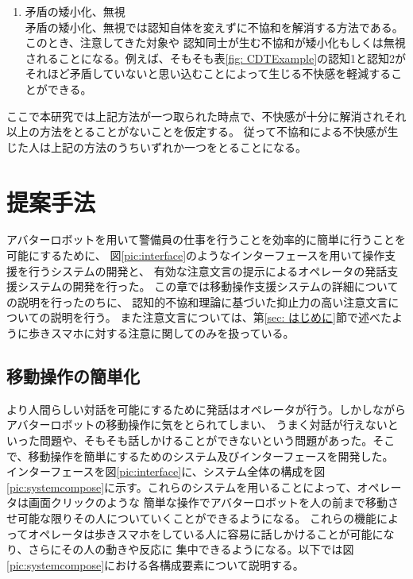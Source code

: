 \documentclass{kuisthesis}
\begin{document}
\begin{enumerate}
\begin{table}[H]
\end{table}

  \item 矛盾の矮小化、無視 \\
  矛盾の矮小化、無視では認知自体を変えずに不協和を解消する方法である。このとき、注意してきた対象や
  認知同士が生む不協和が矮小化もしくは無視されることになる。例えば、そもそも表\ref{fig: CDTExample}の認知1と認知2が
それほど矛盾していないと思い込むことによって生じる不快感を軽減することができる。

\end{enumerate}
\vspace{3mm}
ここで本研究では上記方法が一つ取られた時点で、不快感が十分に解消されそれ以上の方法をとることがないことを仮定する。
従って不協和による不快感が生じた人は上記の方法のうちいずれか一つをとることになる。

\vspace{3mm}

\section{提案手法}
アバターロボットを用いて警備員の仕事を行うことを効率的に簡単に行うことを可能にするために、
図\ref{pic:interface}のようなインターフェースを用いて操作支援を行うシステムの開発と、
有効な注意文言の提示によるオペレータの発話支援システムの開発を行った。
この章では移動操作支援システムの詳細についての説明を行ったのちに、
認知的不協和理論に基づいた抑止力の高い注意文言についての説明を行う。
また注意文言については、第\ref{sec: はじめに}節で述べたように歩きスマホに対する注意に関してのみを扱っている。

\subsection{移動操作の簡単化}
より人間らしい対話を可能にするために発話はオペレータが行う。しかしながらアバターロボットの移動操作に気をとられてしまい、
うまく対話が行えないといった問題や、そもそも話しかけることができないという問題があった。そこで、移動操作を簡単にするためのシステム及びインターフェースを開発した。
インターフェースを図\ref{pic:interface}に、システム全体の構成を図\ref{pic:systemcompose}に示す。これらのシステムを用いることによって、オペレータは画面クリックのような
簡単な操作でアバターロボットを人の前まで移動させ可能な限りその人についていくことができるようになる。
これらの機能によってオペレータは歩きスマホをしている人に容易に話しかけることが可能になり、さらにその人の動きや反応に
集中できるようになる。以下では図\ref{pic:systemcompose}における各構成要素について説明する。
\end{document}
